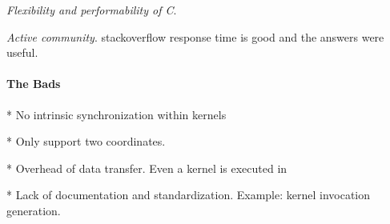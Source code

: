 \textit{Flexibility and performability of C}.

\textit{Active community}. stackoverflow response time is good and the answers were useful.

\paragraph{The Bads}

* No intrinsic synchronization within kernels

* Only support two coordinates.

* Overhead of data transfer. Even a kernel is executed in 

* Lack of documentation and standardization. Example: kernel invocation generation.


